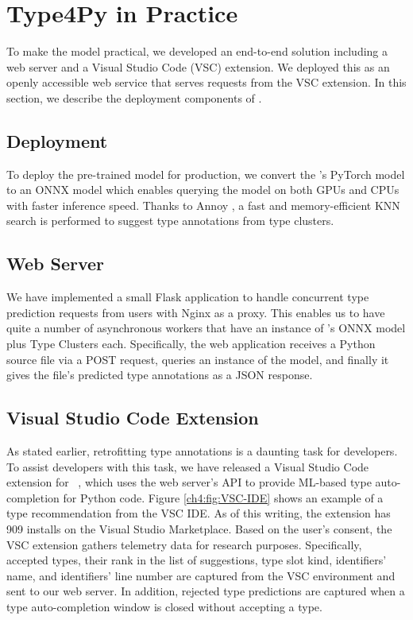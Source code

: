 \section{Type4Py in Practice}\label{ch4:sec:prac}
To make the \name model practical, we developed an end-to-end solution including a web server and a Visual Studio Code (VSC) extension. We deployed this as an openly accessible web service that serves requests from the VSC extension. In this section, we describe the deployment components of \name.

\subsection{Deployment}
To deploy the pre-trained \name model for production, we convert the \name's PyTorch model to an ONNX model \cite{onnxruntime} which enables querying the model on both GPUs and CPUs with faster inference speed. Thanks to Annoy \cite{annoy}, a fast and memory-efficient KNN search is performed to suggest type annotations from type clusters.

\subsection{Web Server}
We have implemented a small Flask application to handle concurrent type prediction requests from users with Nginx as a proxy. This enables us to have quite a number of asynchronous workers that have an instance of \name’s ONNX model plus Type Clusters each. Specifically, the web application receives a Python source file via a POST request, queries an instance of the model, and finally it gives the file's predicted type annotations as a JSON response.

\subsection{Visual Studio Code Extension}
As stated earlier, retrofitting type annotations is a daunting task for developers. To assist developers with this task, we have released a Visual Studio Code extension for \name~\cite{vscodet4py}, which uses the web server's API to provide ML-based type auto-completion for Python code. Figure \ref{ch4:fig:VSC-IDE} shows an example of a type recommendation from the VSC IDE. As of this writing, the extension has 909 installs on the Visual Studio Marketplace. Based on the user's consent, the VSC extension gathers telemetry data for research purposes. Specifically, accepted types, their rank in the list of suggestions, type slot kind, identifiers' name, and identifiers' line number are captured from the VSC environment and sent to our web server. In addition, rejected type predictions are captured when a type auto-completion window is closed without accepting a type.

